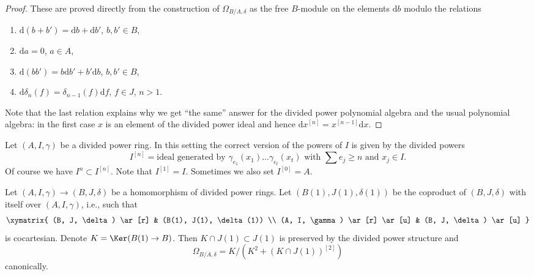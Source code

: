 \begin{proof}
These are proved directly from the construction of $\Omega_{B/A, \delta}$
as the free $B$-module on the elements $\text{d}b$ modulo the relations
\begin{enumerate}
\item $\text{d}(b + b') = \text{d}b + \text{d}b'$, $b, b' \in B$,
\item $\text{d}a = 0$, $a \in A$,
\item $\text{d}(bb') = b \text{d}b' + b' \text{d}b$, $b, b' \in B$,
\item $\text{d}\delta_n(f) = \delta_{n - 1}(f)\text{d}f$, $f \in J$, $n > 1$.
\end{enumerate}
Note that the last relation explains why we get ``the same'' answer for
the divided power polynomial algebra and the usual polynomial algebra:
in the first case $x$ is an element of the divided power ideal and hence
$\text{d}x^{[n]} = x^{[n - 1]}\text{d}x$.
\end{proof}

\noindent
Let $(A, I, \gamma)$ be a divided power ring. In this setting the
correct version of the powers of $I$ is given by the divided powers
$$
I^{[n]} = \text{ideal generated by }
\gamma_{e_1}(x_1) \ldots \gamma_{e_t}(x_t)
\text{ with }\sum e_j \geq n\text{ and }x_j \in I.
$$
Of course we have $I^n \subset I^{[n]}$. Note that $I^{[1]} = I$.
Sometimes we also set $I^{[0]} = A$.

\begin{lemma}
\label{lemma-diagonal-and-differentials}
Let $(A, I, \gamma) \to (B, J, \delta)$ be a homomorphism
of divided power rings. Let $(B(1), J(1), \delta(1))$ be the coproduct
of $(B, J, \delta)$ with itself over $(A, I, \gamma)$, i.e.,
such that
$$
\xymatrix{
(B, J, \delta) \ar[r] & (B(1), J(1), \delta(1)) \\
(A, I, \gamma) \ar[r] \ar[u] & (B, J, \delta) \ar[u]
}
$$
is cocartesian. Denote $K = \Ker(B(1) \to B)$.
Then $K \cap J(1) \subset J(1)$ is preserved by the divided power
structure and
$$
\Omega_{B/A, \delta} = K/ \left(K^2 + (K \cap J(1))^{[2]}\right)
$$
canonically.
\end{lemma}

